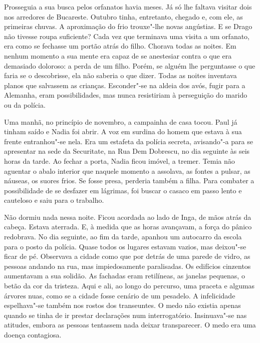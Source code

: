 \bigskip

Prosseguia a sua busca pelos orfanatos havia meses. Já só lhe faltava
visitar dois nos arredores de Bucareste. Outubro tinha, entretanto,
chegado e, com ele, as primeiras chuvas. A aproximação do frio
trouxe"-lhe novas angústias. E se Drago não tivesse roupa suficiente?
Cada vez que terminava uma visita a um orfanato, era como se fechasse um
portão atrás do filho. Chorava todas as noites. Em nenhum momento a sua
mente era capaz de se anestesiar contra o que era demasiado doloroso:
a perda de um filho. Porém, se alguém lhe perguntasse o que faria se o
descobrisse, ela não saberia o que dizer. Todas as noites inventava
planos que salvassem as crianças. Esconder"-se na aldeia dos avós, fugir
para a Alemanha, eram possibilidades, mas nunca resistiriam à
perseguição do marido ou da polícia.

Uma manhã, no princípio de novembro, a campainha
de casa tocou. Paul já tinham saído e Nadia foi abrir. A voz em surdina
do homem que estava à sua frente entranhou"-se nela. Era um estafeta da polícia secreta, avisando"-a para se
apresentar na sede da Securitate, na Rua Dem Dobrescu, no dia seguinte
às seis horas da tarde. Ao fechar a porta, Nadia ficou imóvel, a tremer.
Temia não aguentar
o abalo interior que naquele momento a assolava, as fontes a pulsar, as
náuseas, os suores frios. Se fosse presa, perderia também a filha. Para
combater a possibilidade de se desfazer em lágrimas, foi buscar o
casaco em passo lento e cauteloso e saiu para o trabalho.

\bigskip

Não dormiu nada nessa noite. Ficou acordada ao lado de Inga, de mãos
atrás da cabeça. Estava aterrada. E, à medida que as horas avançavam, a
força do pânico redobrava. No dia seguinte, ao fim da tarde, apanhou
um autocarro da escola para o posto da polícia. Quase todos os lugares
estavam vazios, mas deixou"-se ficar de pé. Observava a cidade como que
por detrás de uma parede de vidro, as pessoas andando na rua, mas
impiedosamente paralisadas. Os edifícios cinzentos aumentavam a sua
solidão. As fachadas eram retilíneas, as janelas pequenas, o betão da
cor da tristeza. Aqui e ali, ao longo do percurso, uma praceta e
algumas árvores nuas, como se a cidade fosse cenário de um pesadelo. A
infelicidade espelhava"-se também nos rostos dos transeuntes. O medo
não existia apenas quando se tinha de ir prestar declarações num
interrogatório. Insinuava"-se nas atitudes, embora as pessoas tentassem
nada deixar transparecer. O medo era uma doença contagiosa.

